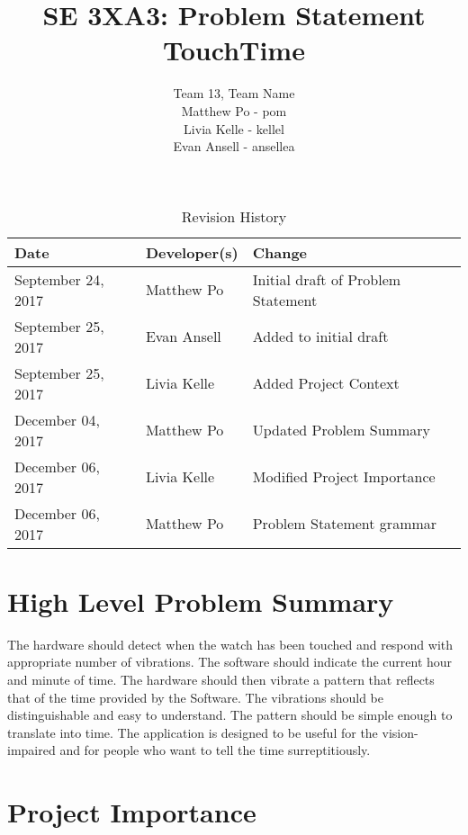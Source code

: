 \documentclass{article}
\title{SE 3XA3: Problem Statement\\TouchTime}
\author{Team 13, Team Name
		\\ Matthew Po - pom
		\\ Livia Kelle - kellel
		\\ Evan Ansell - ansellea
}
\date{}
\begin{document}
\begin{table}[hp]
\caption{Revision History} \label{TblRevisionHistory}
\begin{tabularx}{\textwidth}{llX}
\toprule
\textbf{Date} & \textbf{Developer(s)} & \textbf{Change}\\
\midrule
September 24, 2017 & Matthew Po & Initial draft of Problem Statement\\
September 25, 2017 & Evan Ansell & Added to initial draft\\
September 25, 2017 & Livia Kelle & Added Project Context\\
December 04, 2017 & Matthew Po & Updated Problem Summary\\
December 06, 2017 & Livia Kelle & Modified Project Importance\\
December 06, 2017 & Matthew Po & Problem Statement grammar\\
\bottomrule
\end{tabularx}
\end{table}

\newpage

\maketitle

\section{High Level Problem Summary}
\vspace{0.3cm}

The hardware should detect when the watch has been touched and respond with appropriate number of vibrations. The software should indicate the current hour and minute of time. The hardware should then vibrate a pattern that reflects that of the time provided by the Software. The vibrations should be distinguishable and easy to understand. The pattern should be simple enough to translate into time. The application is designed to be useful for the vision-impaired and for people who want to tell the time surreptitiously.
\vspace{0.3cm}

\section{Project Importance}
\vspace{0.3cm}
\end{document}
